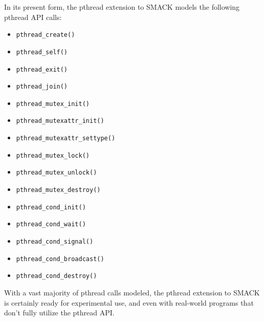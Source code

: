 In its present form, the pthread extension to SMACK models the
following pthread API calls:

\begin{itemize}
\item \lstinline|pthread_create()|
\item \lstinline|pthread_self()|
\item \lstinline|pthread_exit()|
\item \lstinline|pthread_join()|
\item \lstinline|pthread_mutex_init()|
\item \lstinline|pthread_mutexattr_init()|
\item \lstinline|pthread_mutexattr_settype()|
\item \lstinline|pthread_mutex_lock()|
\item \lstinline|pthread_mutex_unlock()|
\item \lstinline|pthread_mutex_destroy()|
\item \lstinline|pthread_cond_init()|
\item \lstinline|pthread_cond_wait()|
\item \lstinline|pthread_cond_signal()|
\item \lstinline|pthread_cond_broadcast()|
\item \lstinline|pthread_cond_destroy()|
\end{itemize}

With a vast majority of pthread calls modeled, the pthread extension
to SMACK is certainly ready for experimental use, and even with
real-world programs that don't fully utilize the pthread API.

